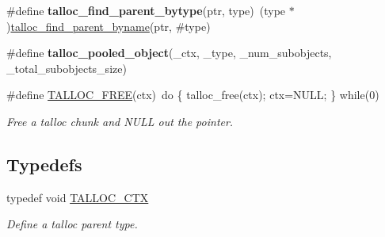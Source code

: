 \begin{DoxyCompactItemize}
\item 
\hypertarget{group__talloc_ga8fd0116a79837a6c02069aa849572875}{}\#define {\bfseries talloc\+\_\+find\+\_\+parent\+\_\+bytype}(ptr,  type)~(type $\ast$)\hyperlink{group__talloc_gaa5dee9fd4d8d4700f14ea4dd92cd4f14}{talloc\+\_\+find\+\_\+parent\+\_\+byname}(ptr, \#type)\label{group__talloc_ga8fd0116a79837a6c02069aa849572875}

\item 
\#define {\bfseries talloc\+\_\+pooled\+\_\+object}(\+\_\+ctx,  \+\_\+type,  \+\_\+num\+\_\+subobjects,  \+\_\+total\+\_\+subobjects\+\_\+size)
\item 
\#define \hyperlink{group__talloc_ga2b3203a43d49423d064e1d889f6c584d}{T\+A\+L\+L\+O\+C\+\_\+\+F\+R\+E\+E}(ctx)~do \{ talloc\+\_\+free(ctx); ctx=N\+U\+L\+L; \} while(0)
\begin{DoxyCompactList}\small\item\em Free a talloc chunk and N\+U\+L\+L out the pointer. \end{DoxyCompactList}\end{DoxyCompactItemize}
\subsection*{Typedefs}
\begin{DoxyCompactItemize}
\item 
typedef void \hyperlink{group__talloc_ga8a521b1347c0e37b84eb942db8fa9beb}{T\+A\+L\+L\+O\+C\+\_\+\+C\+T\+X}
\begin{DoxyCompactList}\small\item\em Define a talloc parent type. \end{DoxyCompactList}\end{DoxyCompactItemize}
